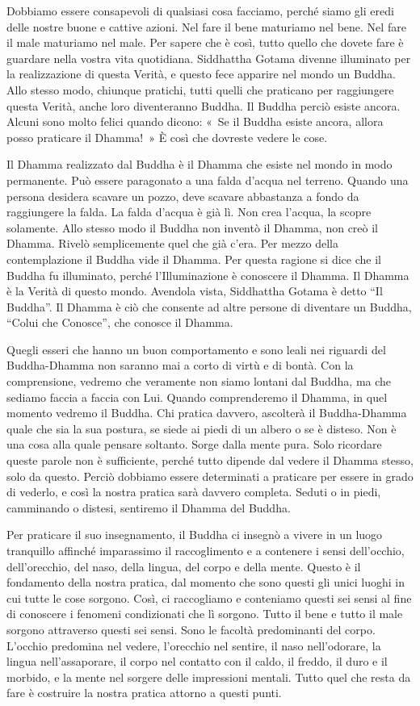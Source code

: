 Dobbiamo essere consapevoli di qualsiasi cosa facciamo, perché siamo gli
eredi delle nostre buone e cattive azioni. Nel fare il bene maturiamo
nel bene. Nel fare il male maturiamo nel male. Per sapere che è così,
tutto quello che dovete fare è guardare nella vostra vita quotidiana.
Siddhattha Gotama divenne illuminato per la realizzazione di questa
Verità, e questo fece apparire nel mondo un Buddha. Allo stesso modo,
chiunque pratichi, tutti quelli che praticano per raggiungere questa
Verità, anche loro diventeranno Buddha. Il Buddha perciò esiste ancora.
Alcuni sono molto felici quando dicono: «~Se il Buddha esiste ancora,
allora posso praticare il Dhamma!~» È così che dovreste vedere le cose.

Il Dhamma realizzato dal Buddha è il Dhamma che esiste nel mondo in modo
permanente. Può essere paragonato a una falda d'acqua nel terreno.
Quando una persona desidera scavare un pozzo, deve scavare abbastanza a
fondo da raggiungere la falda. La falda d'acqua è già lì. Non crea
l'acqua, la scopre solamente. Allo stesso modo il Buddha non inventò il
Dhamma, non creò il Dhamma. Rivelò semplicemente quel che già c'era. Per
mezzo della contemplazione il Buddha vide il Dhamma. Per questa ragione
si dice che il Buddha fu illuminato, perché l'Illuminazione è conoscere
il Dhamma. Il Dhamma è la Verità di questo mondo. Avendola vista,
Siddhattha Gotama è detto ``Il Buddha''. Il Dhamma è ciò che consente ad
altre persone di diventare un Buddha, ``Colui che Conosce'', che conosce
il Dhamma.

Quegli esseri che hanno un buon comportamento e sono leali nei riguardi
del Buddha-Dhamma non saranno mai a corto di virtù e di bontà. Con la
comprensione, vedremo che veramente non siamo lontani dal Buddha, ma che
sediamo faccia a faccia con Lui. Quando comprenderemo il Dhamma, in quel
momento vedremo il Buddha. Chi pratica davvero, ascolterà il
Buddha-Dhamma quale che sia la sua postura, se siede ai piedi di un
albero o se è disteso. Non è una cosa alla quale pensare soltanto. Sorge
dalla mente pura. Solo ricordare queste parole non è sufficiente, perché
tutto dipende dal vedere il Dhamma stesso, solo da questo. Perciò
dobbiamo essere determinati a praticare per essere in grado di vederlo,
e così la nostra pratica sarà davvero completa. Seduti o in piedi,
camminando o distesi, sentiremo il Dhamma del Buddha.

Per praticare il suo insegnamento, il Buddha ci insegnò a vivere in un
luogo tranquillo affinché imparassimo il raccoglimento e a contenere i
sensi dell'occhio, dell'orecchio, del naso, della lingua, del corpo e
della mente. Questo è il fondamento della nostra pratica, dal momento
che sono questi gli unici luoghi in cui tutte le cose sorgono. Così, ci
raccogliamo e conteniamo questi sei sensi al fine di conoscere i
fenomeni condizionati che lì sorgono. Tutto il bene e tutto il male
sorgono attraverso questi sei sensi. Sono le facoltà predominanti del
corpo. L'occhio predomina nel vedere, l'orecchio nel sentire, il naso
nell'odorare, la lingua nell'assaporare, il corpo nel contatto con il
caldo, il freddo, il duro e il morbido, e la mente nel sorgere delle
impressioni mentali. Tutto quel che resta da fare è costruire la nostra
pratica attorno a questi punti.

